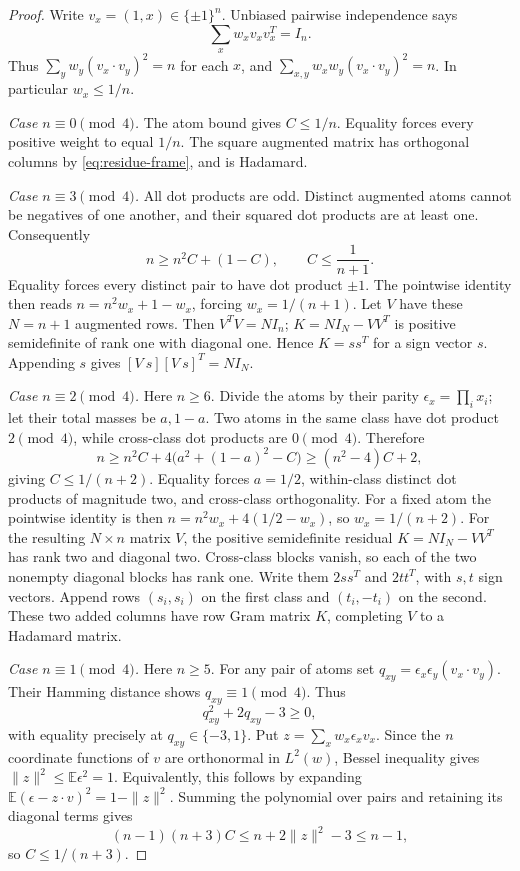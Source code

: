 \documentclass[11pt]{article}
\begin{document}
\begin{proof}
Write $v_x=(1,x)\in\{\pm1\}^n$. Unbiased pairwise independence says
\begin{equation}\label{eq:residue-frame}
 \sum_xw_xv_xv_x^T=I_n.
\end{equation}
Thus $\sum_yw_y(v_x\cdot v_y)^2=n$ for each $x$, and
$\sum_{x,y}w_xw_y(v_x\cdot v_y)^2=n$.
In particular $w_x\le1/n$.

\emph{Case $n\equiv0\pmod4$.}
The atom bound gives $C\le1/n$. Equality forces every positive weight
to equal $1/n$. The square augmented matrix has orthogonal columns
by \eqref{eq:residue-frame}, and is Hadamard.

\emph{Case $n\equiv3\pmod4$.}
All dot products are odd. Distinct augmented atoms cannot be negatives
of one another, and their squared dot products are at least one.
Consequently
\[
 n\ge n^2C+(1-C),\qquad C\le\frac1{n+1}.
\]
Equality forces every distinct pair to have dot product $\pm1$.
The pointwise identity then reads
$n=n^2w_x+1-w_x$, forcing $w_x=1/(n+1)$.
Let $V$ have these $N=n+1$ augmented rows. Then $V^TV=NI_n$;
$K=NI_N-VV^T$ is positive semidefinite of rank one with diagonal
one. Hence $K=ss^T$ for a sign vector $s$. Appending $s$ gives
$[V\ s][V\ s]^T=NI_N$.

\emph{Case $n\equiv2\pmod4$.}
Here $n\ge6$. Divide the atoms by their parity
$\epsilon_x=\prod_i x_i$; let their total masses be $a,1-a$.
Two atoms in the same class have dot product $2\pmod4$, while
cross-class dot products are $0\pmod4$. Therefore
\[
 n\ge n^2C+4\big(a^2+(1-a)^2-C\big)
       \ge(n^2-4)C+2,
\]
giving $C\le1/(n+2)$. Equality forces $a=1/2$, within-class
distinct dot products of magnitude two, and cross-class orthogonality.
For a fixed atom the pointwise identity is then
$n=n^2w_x+4(1/2-w_x)$, so $w_x=1/(n+2)$.
For the resulting $N\times n$ matrix $V$, the positive semidefinite
residual $K=NI_N-VV^T$ has rank two and diagonal two. Cross-class
blocks vanish, so each of the two nonempty diagonal blocks has rank
one. Write them $2ss^T$ and $2tt^T$, with $s,t$ sign vectors.
Append rows $(s_i,s_i)$ on the first class and $(t_i,-t_i)$ on the
second. These two added columns have row Gram matrix $K$, completing
$V$ to a Hadamard matrix.

\emph{Case $n\equiv1\pmod4$.}
Here $n\ge5$. For any pair of atoms set
$q_{xy}=\epsilon_x\epsilon_y(v_x\cdot v_y)$.
Their Hamming distance shows $q_{xy}\equiv1\pmod4$. Thus
\[
 q_{xy}^2+2q_{xy}-3\ge0,
\]
with equality precisely at $q_{xy}\in\{-3,1\}$.
Put $z=\sum_xw_x\epsilon_xv_x$. Since the $n$ coordinate functions
of $v$ are orthonormal in $L^2(w)$, Bessel inequality gives
$\|z\|^2\le\mathbb E\epsilon^2=1$. Equivalently, this follows by
expanding $\mathbb E(\epsilon-z\cdot v)^2=1-\|z\|^2$.
Summing the polynomial over pairs and retaining its diagonal terms gives
\[
 (n-1)(n+3)C\le n+2\|z\|^2-3\le n-1,
\]
so $C\le1/(n+3)$.


\end{proof}
\end{document}
